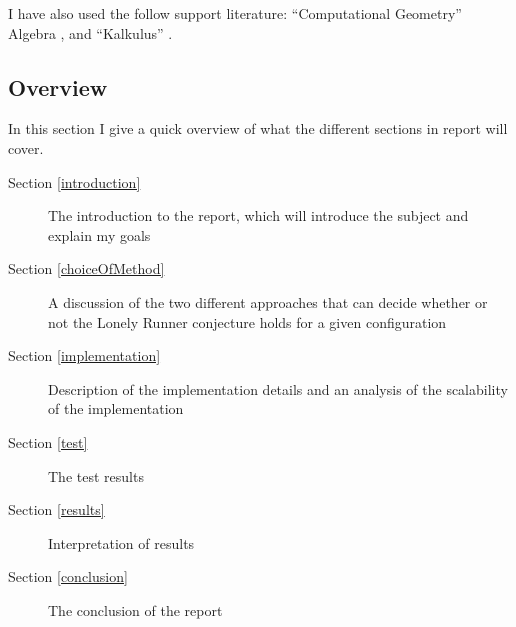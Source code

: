 I have also used the follow support literature:
``Computational Geometry'' \cite{citeulike:3347056} Algebra , and ``Kalkulus'' \cite{kalkulus}.

\subsection{Overview}

In this section I give a quick overview of what the different sections in report will cover.
\begin{description}
\item[Section \ref{introduction}] The introduction to the report, which will introduce the subject and explain my goals
\item[Section \ref{choiceOfMethod}] A discussion of the two different approaches that can decide whether or not the Lonely Runner conjecture holds for a given configuration
\item[Section \ref{implementation}] Description of the implementation details and an analysis of the scalability of the implementation
\item[Section \ref{test}] The test results
\item[Section \ref{results}] Interpretation of results
\item[Section \ref{conclusion}] The conclusion of the report  
\end{description}
